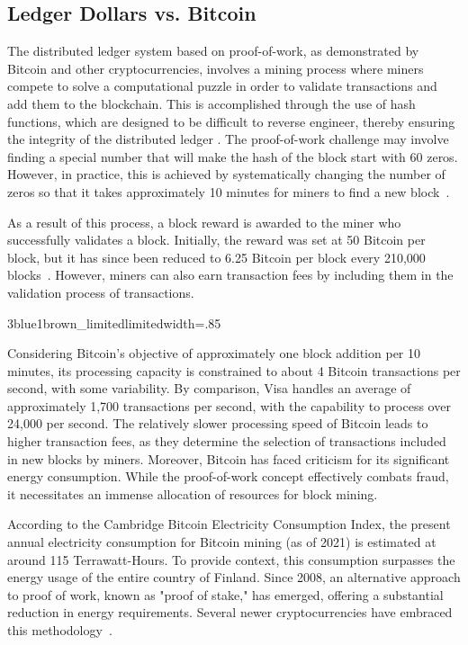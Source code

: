 \subsection{Ledger Dollars vs. Bitcoin}
The distributed ledger system based on proof-of-work, as demonstrated by Bitcoin and other cryptocurrencies, involves a mining process where
miners compete to solve a computational puzzle in order to validate transactions and add them to the blockchain. This is accomplished through
the use of hash functions, which are designed to be difficult to reverse engineer, thereby ensuring the integrity of the distributed ledger
\cite{bashir2017mastering}. The proof-of-work challenge may involve finding a special number that will make the hash of the block start with
60 zeros. However, in practice, this is achieved by systematically changing the number of zeros so that it takes approximately 10 minutes
for miners to find a new block~\cite{nakamoto2008bitcoin}.

As a result of this process, a block reward is awarded to the miner who successfully validates a block. Initially, the reward was set at
50 Bitcoin per block, but it has since been reduced to 6.25 Bitcoin per block every 210,000 blocks~\cite{nakamoto2008bitcoin}. However,
miners can also earn transaction fees by including them in the validation process of transactions.

{3blue1brown_limited}{limited}{width=.85\textwidth}%

Considering Bitcoin's objective of approximately one block addition per 10 minutes, its processing capacity is constrained to about 4 Bitcoin
transactions per second, with some variability. By comparison, Visa handles an average of approximately 1,700 transactions per second, with
the capability to process over 24,000 per second. The relatively slower processing speed of Bitcoin leads to higher transaction fees, as
they determine the selection of transactions included in new blocks by miners. Moreover, Bitcoin has faced criticism for its significant
energy consumption. While the proof-of-work concept effectively combats fraud, it necessitates an immense allocation of resources for block
mining.

According to the Cambridge Bitcoin Electricity Consumption Index, the present annual electricity consumption for Bitcoin mining (as of 2021)
is estimated at around 115 Terrawatt-Hours. To provide context, this consumption surpasses the energy usage of the entire country of Finland.
Since 2008, an alternative approach to proof of work, known as "proof of stake," has emerged, offering a substantial reduction in energy
requirements. Several newer cryptocurrencies have embraced this methodology~\cite{CBECS2021}.
